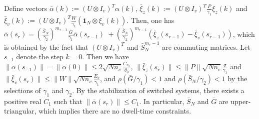 \documentclass{autart}
\begin{document}
Define vectors $\bar \alpha(k) := (U \otimes I_{v}) ^T \alpha(k)$, $\bar \xi_z(k) := (U \otimes I_{v})^T \frac{P}{\gamma_1} \xi_z(k)$ and $ \bar \xi_v(k) := (U \otimes I_{v})^T \frac{W}{\gamma_1} (\mathbf 1 _N \otimes \xi_v(k))$. Then, one has   
$
\bar \alpha(s_{r})=(\frac{\bar S_N}{\gamma_2})^{m_{r-1}}    \frac{\bar G}{\gamma_1}    \bar \alpha(s_{r-1}) 
\,\, +  
(\frac{\bar S_N}{\gamma_2})^{m_{r-1}}  ( \bar \xi_z(s_{r-1})-\bar  \xi_v(s_{r-1}))
$, 
which is obtained by the fact that $(U \otimes I_v) ^T$ and $\bar S_N ^{m_r -1}$ are commuting matrices. 
Let $s_{-1}$ denote the step $k=0$. Then we have $\|\alpha(s_{-1})\| = \|\alpha(0)\| \le 2 \sqrt{N n_v}\frac{C_{x_0}}{\theta_0}$, $\|\bar  \xi_{z}(s_r)\|\le \|P\|\sqrt{N n_v}\frac{\sigma}{\gamma_1}$ and $\|\bar  \xi_{v}(s_r)\|\le \|W\|\sqrt{N n_v}\frac{E_v}{\gamma_1}$, and $\rho(\bar G/\gamma_1)<1$ and $\rho(\bar S_N/\gamma_2)< 1$ by the selections of $\gamma_1$ and $\gamma_2$. By the stabilization of switched systems, there exists a positive real $C_1$ such that $\|\bar \alpha (s_r) \|  \le C_1$.  
In particular, $\bar S _N $ and $\bar G $ are upper-triangular, which implies there are no dwell-time constraints. 
\end{document}
